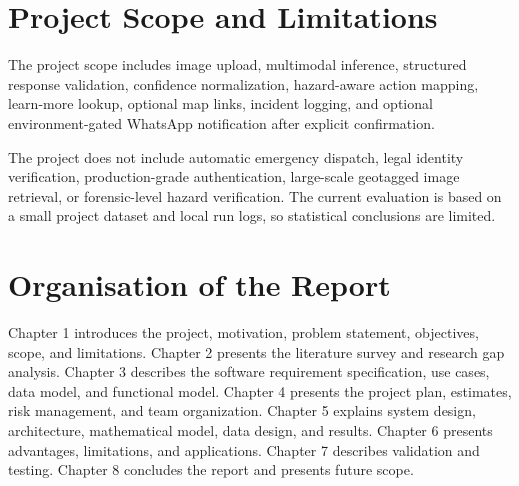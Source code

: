 \section{Project Scope and Limitations}
The project scope includes image upload, multimodal inference, structured response validation, confidence normalization, hazard-aware action mapping, learn-more lookup, optional map links, incident logging, and optional environment-gated WhatsApp notification after explicit confirmation.

The project does not include automatic emergency dispatch, legal identity verification, production-grade authentication, large-scale geotagged image retrieval, or forensic-level hazard verification. The current evaluation is based on a small project dataset and local run logs, so statistical conclusions are limited.

\section{Organisation of the Report}
Chapter 1 introduces the project, motivation, problem statement, objectives, scope, and limitations. Chapter 2 presents the literature survey and research gap analysis. Chapter 3 describes the software requirement specification, use cases, data model, and functional model. Chapter 4 presents the project plan, estimates, risk management, and team organization. Chapter 5 explains system design, architecture, mathematical model, data design, and results. Chapter 6 presents advantages, limitations, and applications. Chapter 7 describes validation and testing. Chapter 8 concludes the report and presents future scope.
